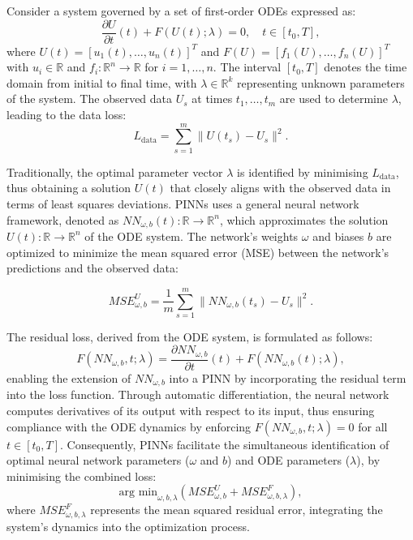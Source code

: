 \documentclass[12pt]{article}
\begin{document}
Consider a system governed by a set of first-order ODEs expressed as:
\begin{equation}
\frac{\partial U}{\partial t}(t) + F(U(t); \lambda) = 0, \quad t \in [t_0, T],
\end{equation}
where $U(t) = [u_1(t), \ldots, u_n(t)]^T$ and $F(U) = [f_1(U), \ldots, f_n(U)]^T$ with $u_i \in \mathbb{R}$ and $f_i: \mathbb{R}^n \rightarrow \mathbb{R}$ for $i = 1, \ldots, n$. The interval $[t_0, T]$ denotes the time domain from initial to final time, with $\lambda \in \mathbb{R}^k$ representing unknown parameters of the system. The observed data $U_s$ at times $t_1, \ldots, t_m$ are used to determine $\lambda$, leading to the data loss:
\begin{equation}
L_{\text{data}} = \sum_{s=1}^{m} \|U(t_s) - U_s\|^2.
\end{equation}

Traditionally, the optimal parameter vector $\lambda$ is identified by minimising $L_{\text{data}}$, thus obtaining a solution $U(t)$ that closely aligns with the observed data in terms of least squares deviations. PINNs uses a general neural network framework, denoted as $NN_{\omega,b}(t): \mathbb{R} \rightarrow \mathbb{R}^n$, which approximates the solution $U(t): \mathbb{R} \rightarrow \mathbb{R}^n$ of the ODE system. The network's weights $\omega$ and biases $b$ are optimized to minimize the mean squared error (MSE) between the network's predictions and the observed data:

\begin{equation}[h]
    MSE_{\omega,b}^U = \frac{1}{m} \sum_{s=1}^{m} \|NN_{\omega,b}(t_s) - U_s\|^2.
\end{equation}

The residual loss, derived from the ODE system, is formulated as follows:
\begin{equation}
F(NN_{\omega,b}, t; \lambda) = \frac{\partial NN_{\omega,b}}{\partial t}(t) + F(NN_{\omega,b}(t); \lambda),
\end{equation}
enabling the extension of $NN_{\omega,b}$ into a PINN by incorporating the residual term into the loss function. Through automatic differentiation, the neural network computes derivatives of its output with respect to its input, thus ensuring compliance with the ODE dynamics by enforcing $F(NN_{\omega,b}, t; \lambda) = 0$ for all $t \in [t_0, T]$. Consequently, PINNs facilitate the simultaneous identification of optimal neural network parameters ($\omega$ and $b$) and ODE parameters ($\lambda$), by minimising the combined loss:
\begin{equation}
\text{arg min}_{\omega, b, \lambda} \left( MSE_{\omega,b}^U + MSE_{\omega,b,\lambda}^F \right),
\end{equation}
where $MSE_{\omega,b,\lambda}^F$ represents the mean squared residual error, integrating the system's dynamics into the optimization process.
\end{document}

